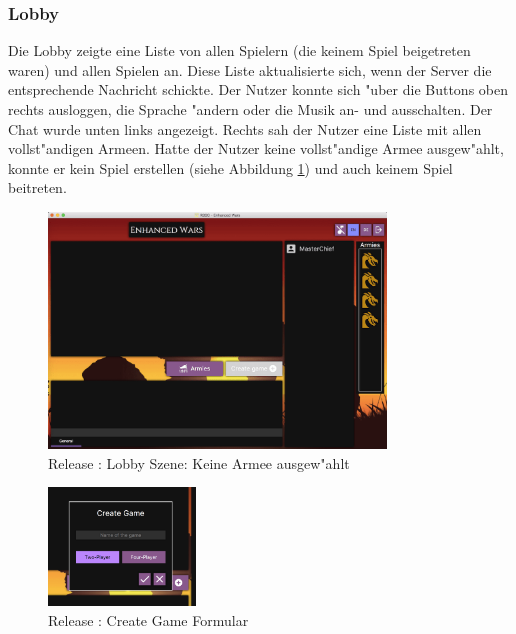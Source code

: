 \documentclass[12pt, titlepage]{scrartcl}
\newcommand{\RN}[1]{%
	\textup{\uppercase\expandafter{\romannumeral#1}}%
}
\begin{document}
            \subsubsection{Lobby} \label{LOBBY}
                Die Lobby zeigte eine Liste von allen Spielern (die keinem Spiel beigetreten waren) und allen Spielen an. Diese Liste aktualisierte sich, wenn der Server die entsprechende Nachricht schickte. Der Nutzer konnte sich "uber die Buttons oben rechts ausloggen, die Sprache "andern oder die Musik an- und ausschalten. Der Chat wurde unten links angezeigt. Rechts sah der Nutzer eine Liste mit allen vollst"andigen Armeen. Hatte der Nutzer keine vollst"andige Armee ausgew"ahlt, konnte er kein Spiel erstellen (siehe Abbildung \ref{Lobby_No_Army_Selected}) und auch keinem Spiel beitreten. \\
                \begin{figure}[H] 
    				\centering
    				\includegraphics[width=0.8\textwidth]{images/old_state/lobby/NoArmySelected.png}
    				\caption{Release \RN{2}: Lobby Szene: Keine Armee ausgew"ahlt}
    				\label{Lobby_No_Army_Selected}
			    \end{figure}
			    \begin{figure}
                    \begin{center}
                        \includegraphics[width=0.35\textwidth]{images/old_state/lobby/CreateGame.png}
                    \end{center}
                    \caption{Release \RN{2}: Create Game Formular}
                    \label{Create_Game}
                \end{figure}
\end{document}
